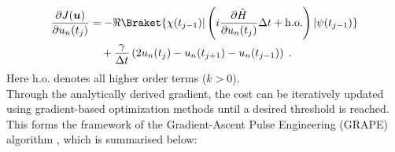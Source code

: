 \begin{align}
	\frac{\partial J (\boldsymbol{u})}{\partial u_n (t_j)}  &= - \Re \Braket{\chi (t_{j-1}) | \left( i \frac{\partial \hat{H}}{\partial u_n (t_j)} \Delta t + \mathrm{h.o.} \right)  | \psi (t_{j-1})}  \nonumber \\
	& \quad + \frac{\gamma}{\Delta t} \left( 2 u_n (t_j) - u_n (t_{j+1}) - u_n (t_{j-1}) \right) \; .
	\label{eq:costGradient}
\end{align}
Here $\mathrm{h.o.}$ denotes all higher order terms ($k > 0$).\\ 
Through the analytically derived gradient, the cost can be iteratively updated using gradient-based optimization methods until a desired threshold is reached. This forms the framework of the Gradient-Ascent Pulse Engineering (GRAPE) algorithm \cite{Khaneja2005}, which is summarised below:

